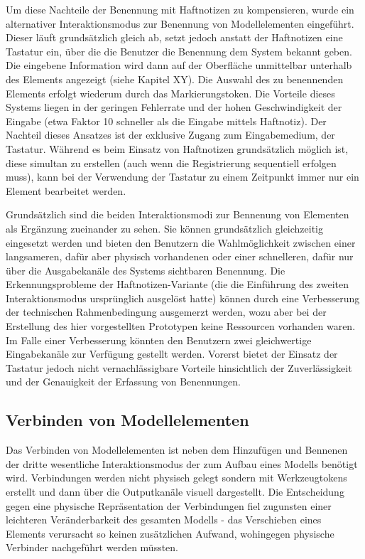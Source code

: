 Um diese Nachteile der Benennung mit Haftnotizen zu kompensieren, wurde ein alternativer Interaktionsmodus zur Benennung von Modellelementen eingeführt. Dieser läuft grundsätzlich gleich ab, setzt jedoch anstatt der Haftnotizen eine Tastatur ein, über die die Benutzer die Benennung dem System bekannt geben. Die eingebene Information wird dann auf der Oberfläche unmittelbar unterhalb des Elements angezeigt (siehe Kapitel XY). Die Auswahl des zu benennenden Elements erfolgt wiederum durch das Markierungstoken. Die Vorteile dieses Systems liegen in der geringen Fehlerrate und der hohen Geschwindigkeit der Eingabe (etwa Faktor 10 schneller als die Eingabe mittels Haftnotiz). Der Nachteil dieses Ansatzes ist der exklusive Zugang zum Eingabemedium, der Tastatur. Während es beim Einsatz von Haftnotizen grundsätzlich möglich ist, diese simultan zu erstellen (auch wenn die Registrierung sequentiell erfolgen muss), kann bei der Verwendung der Tastatur zu einem Zeitpunkt immer nur ein Element bearbeitet werden.

Grundsätzlich sind die beiden Interaktionsmodi zur Bennenung von Elementen als Ergänzung zueinander zu sehen. Sie können grundsätzlich gleichzeitig eingesetzt werden und bieten den Benutzern die Wahlmöglichkeit zwischen einer langsameren, dafür aber physisch vorhandenen oder einer schnelleren, dafür nur über die Ausgabekanäle des Systems sichtbaren Benennung. Die Erkennungsprobleme der Haftnotizen-Variante (die die Einführung des zweiten Interaktionsmodus ursprünglich ausgelöst hatte) können durch eine Verbesserung der technischen Rahmenbedingung ausgemerzt werden, wozu aber bei der Erstellung des hier vorgestellten Prototypen keine Ressourcen vorhanden waren. Im Falle einer Verbesserung könnten den Benutzern zwei gleichwertige Eingabekanäle zur Verfügung gestellt werden. Vorerst bietet der Einsatz der Tastatur jedoch nicht vernachlässigbare Vorteile hinsichtlich der Zuverlässigkeit und der Genauigkeit der Erfassung von Benennungen.


\subsection{Verbinden von Modellelementen} %
\label{sub:verbinden_von_modellelementen}

Das Verbinden von Modellelementen ist neben dem Hinzufügen und Bennenen der dritte wesentliche Interaktionsmodus der zum Aufbau eines Modells benötigt wird. Verbindungen werden nicht physisch gelegt sondern mit Werkzeugtokens erstellt und dann über die Outputkanäle visuell dargestellt. Die Entscheidung gegen eine physische Repräsentation der Verbindungen fiel zugunsten einer leichteren Veränderbarkeit des gesamten Modells - das Verschieben eines Elements verursacht so keinen zusätzlichen Aufwand, wohingegen physische Verbinder nachgeführt werden müssten.


